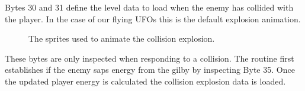 Bytes 30 and 31 define the level data to load when the enemy has collided with the player. In the case of our
flying UFOs this is the default explosion animation.

\begin{figure}[H]
  {
    \setlength{\tabcolsep}{3.0pt}
    \setlength\cmidrulewidth{\heavyrulewidth} %
	\centering
	\def\MULTICOLORONE{white}
	\def\MULTICOLORTWO{red}
	\def\SPRITECOLOR{c64_darkgray}
	\begin{subfigure}{0.3\textwidth}
		
	\end{subfigure}
	\begin{subfigure}{0.3\textwidth}
		
	\end{subfigure}
	\begin{subfigure}{0.3\textwidth}
		
	\end{subfigure}
  }\caption[position=top]{The sprites used to animate the collision explosion.}
\end{figure}

These bytes are only inspected when responding to a collision. The routine 
first establishes if the enemy saps energy from the gilby by inspecting Byte 35. Once the updated player energy
is calculated the collision explosion data is loaded.

